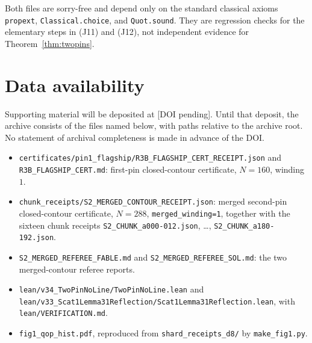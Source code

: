 \documentclass[11pt]{amsart}
\theoremstyle{definition}
\theoremstyle{remark}
\begin{document}
Both files are sorry-free and depend only on the standard classical
axioms \texttt{propext}, \texttt{Classical.choice}, and
\texttt{Quot.sound}. They are regression checks for the elementary
steps in (J11) and (J12), not independent evidence for
Theorem~\ref{thm:twopins}.

\section{Data availability}
\label{sec:data}

Supporting material will be deposited at [DOI pending]. Until that
deposit, the archive consists of the files named below, with paths
relative to the archive root. No statement of archival completeness
is made in advance of the DOI.

\begin{sloppypar}\raggedright
\begin{itemize}
\item
\texttt{certificates/pin1\_flagship/}\allowbreak\texttt{R3B\_FLAGSHIP\_}\allowbreak\texttt{CERT\_RECEIPT.json}
and \texttt{R3B\_FLAGSHIP\_CERT.md}: first-pin closed-contour
certificate, $N=160$, winding $1$.
\item
\texttt{chunk\_receipts/}\allowbreak\texttt{S2\_MERGED\_}\allowbreak\texttt{CONTOUR\_RECEIPT.json}: merged
second-pin closed-contour certificate, $N=288$,
\texttt{merged\_winding=1}, together with the sixteen chunk
receipts \texttt{S2\_CHUNK\_a000-012.json}, \ldots,
\texttt{S2\_CHUNK\_a180-192.json}.
\item
\texttt{S2\_MERGED\_REFEREE\_FABLE.md} and
\texttt{S2\_MERGED\_REFEREE\_SOL.md}: the two merged-contour referee
reports.
\item
\texttt{lean/\allowbreak v34\_TwoPinNoLine/\allowbreak TwoPinNoLine.lean} and
\texttt{lean/\allowbreak v33\_Scat1Lemma31Reflection/\allowbreak }\allowbreak\texttt{Scat1Lemma31Reflection.lean},
with \texttt{lean/VERIFICATION.md}.
\item
\texttt{fig1\_qop\_hist.pdf}, reproduced from
\texttt{shard\_receipts\_d8/} by \texttt{make\_fig1.py}.
\end{itemize}
\end{sloppypar}
\end{document}
